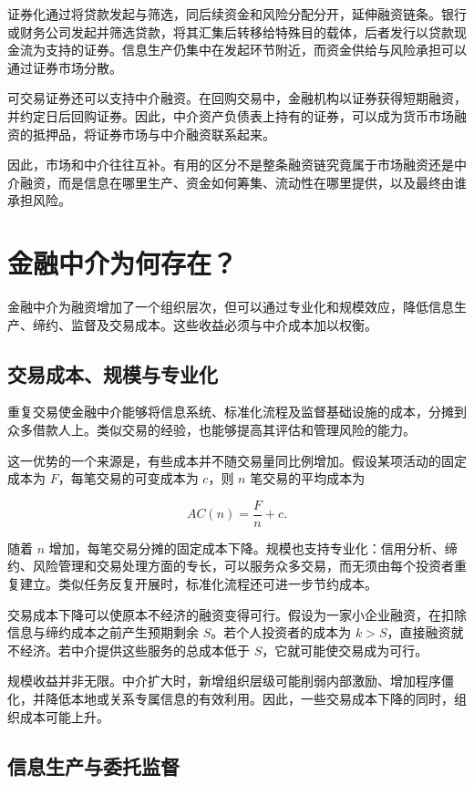证券化通过将贷款发起与筛选，同后续资金和风险分配分开，延伸融资链条。银行或财务公司发起并筛选贷款，将其汇集后转移给特殊目的载体，后者发行以贷款现金流为支持的证券。信息生产仍集中在发起环节附近，而资金供给与风险承担可以通过证券市场分散。

可交易证券还可以支持中介融资。在回购交易中，金融机构以证券获得短期融资，并约定日后回购证券。因此，中介资产负债表上持有的证券，可以成为货币市场融资的抵押品，将证券市场与中介融资联系起来。

因此，市场和中介往往互补。有用的区分不是整条融资链究竟属于市场融资还是中介融资，而是信息在哪里生产、资金如何筹集、流动性在哪里提供，以及最终由谁承担风险。

\section{金融中介为何存在？}

金融中介为融资增加了一个组织层次，但可以通过专业化和规模效应，降低信息生产、缔约、监督及交易成本。这些收益必须与中介成本加以权衡。

\subsection{交易成本、规模与专业化}

重复交易使金融中介能够将信息系统、标准化流程及监督基础设施的成本，分摊到众多借款人上。类似交易的经验，也能够提高其评估和管理风险的能力。

这一优势的一个来源是，有些成本并不随交易量同比例增加。假设某项活动的固定成本为 $F$，每笔交易的可变成本为 $c$，则 $n$ 笔交易的平均成本为

\begin{equation}
AC(n)=\frac{F}{n}+c.
\label{eq:ch4-scale-cost}
\end{equation}

随着 $n$ 增加，每笔交易分摊的固定成本下降。规模也支持专业化：信用分析、缔约、风险管理和交易处理方面的专长，可以服务众多交易，而无须由每个投资者重复建立。类似任务反复开展时，标准化流程还可进一步节约成本。

交易成本下降可以使原本不经济的融资变得可行。假设为一家小企业融资，在扣除信息与缔约成本之前产生预期剩余 $S$。若个人投资者的成本为 $k>S$，直接融资就不经济。若中介提供这些服务的总成本低于 $S$，它就可能使交易成为可行。

规模收益并非无限。中介扩大时，新增组织层级可能削弱内部激励、增加程序僵化，并降低本地或关系专属信息的有效利用。因此，一些交易成本下降的同时，组织成本可能上升。

\subsection{信息生产与委托监督}

